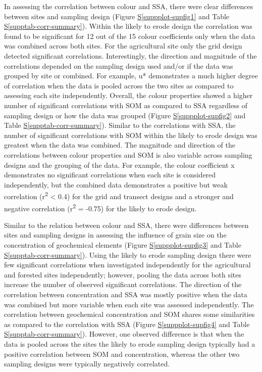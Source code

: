 \documentclass[
  number]{elsarticle}
\newcommand*\quartosuppplotref[1]{Figure \hyperref[#1]{S\ref{#1}}}
\newcommand*\quartosupptabref[1]{Table \hyperref[#1]{S\ref{#1}}}
\begin{document}
In assessing the correlation between colour and SSA, there were clear
differences between sites and sampling design
(\quartosuppplotref{suppplot-supfig1} and
\quartosupptabref{supptab-corr-summary}). Within the likely to erode
design the correlation was found to be significant for 12 out of the 15
colour coefficients only when the data was combined across both sites.
For the agricultural site only the grid design detected significant
correlations. Interestingly, the direction and magnitude of the
correlations depended on the sampling design used and/or if the data was
grouped by site or combined. For example, u* demonstrates a much higher
degree of correlation when the data is pooled across the two sites as
compared to assessing each site independently. Overall, the colour
properties showed a higher number of significant correlations with SOM
as compared to SSA regardless of sampling design or how the data was
grouped (\quartosuppplotref{suppplot-supfig2} and
\quartosupptabref{supptab-corr-summary}). Similar to the correlations
with SSA, the number of significant correlations with SOM within the
likely to erode design was greatest when the data was combined. The
magnitude and direction of the correlations between colour properties
and SOM is also variable across sampling designs and the grouping of the
data. For example, the colour coefficient x demonstrates no significant
correlations when each site is considered independently, but the
combined data demonstrates a positive but weak correlation
(r\textsuperscript{2} \textless{} 0.4) for the grid and transect designs
and a stronger and negative correlation (r\textsuperscript{2} = -0.75)
for the likely to erode design.

Similar to the relation between colour and SSA, there were differences
between sites and sampling designs in assessing the influence of grain
size on the concentration of geochemical elements
(\quartosuppplotref{suppplot-supfig3} and
\quartosupptabref{supptab-corr-summary}). Using the likely to erode
sampling design there were few significant correlations when
investigated independently for the agricultural and forested sites
independently; however, pooling the data across both sites increase the
number of observed significant correlations. The direction of the
correlation between concentration and SSA was mostly positive when the
data was combined but more variable when each site was assessed
independently. The correlation between geochemical concentration and SOM
shares some similarities as compared to the correlation with SSA
(\quartosuppplotref{suppplot-supfig4} and
\quartosupptabref{supptab-corr-summary}). However, one observed
difference is that when the data is pooled across the sites the likely
to erode sampling design typically had a positive correlation between
SOM and concentration, whereas the other two sampling designs were
typically negatively correlated.
\end{document}
